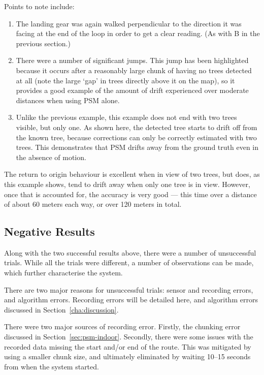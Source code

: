 \documentclass[12pt,oneside,a4paper]{book}
\begin{document}
Points to note include:
\begin{enumerate}[A:]
\item The landing gear was again walked perpendicular to the direction
  it was facing at the end of the loop in order to get a clear
  reading. (As with B in the previous section.)
\item There were a number of significant jumps. This jump has been
  highlighted because it occurs after a reasonably large chunk of
  having no trees detected at all (note the large `gap' in trees
  directly above it on the map), so it provides a good example of the
  amount of drift experienced over moderate distances when using PSM
  alone.
\item Unlike the previous example, this example does not end with two
  trees visible, but only one. As shown here, the detected tree starts
  to drift off from the known tree, because corrections can only be
  correctly estimated with two trees. This demonstrates that PSM
  drifts away from the ground truth even in the absence of motion.
\end{enumerate}

The return to origin behaviour is excellent when in view of two trees,
but does, as this example shows, tend to drift away when only one tree
is in view. However, once that is accounted for, the accuracy is very
good --- this time over a distance of about 60 meters each way, or
over 120 meters in total.
\newpage
\subsection{Negative Results}
\label{sec:negative-results}

Along with the two successful results above, there were a number of
unsuccessful trials. While all the trials were different, a number of
observations can be made, which further characterise the system.

There are two major reasons for unsuccessful trials: sensor and
recording errors, and algorithm errors. Recording errors will be
detailed here, and algorithm errors discussed in
Section~\ref{cha:discussion}.

There were two major sources of recording error. Firstly, the chunking
error discussed in Section~\ref{sec:psm-indoor}. Secondly, there were some
issues with the recorded data missing the start and/or end of the
route. This was mitigated by using a smaller chunk size, and
ultimately eliminated by waiting 10--15 seconds from when the system
started.
\end{document}
